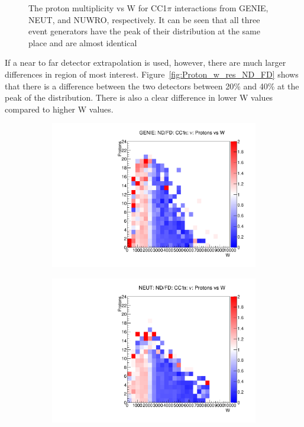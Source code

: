 \documentclass[12pt]{article}
\begin{document}
\begin{figure}
\begin{subfigure}[b]{0.32\textwidth}
\end{subfigure}
\caption{The proton multiplicity vs W for CC1$\pi$ interactions from GENIE, NEUT, and NUWRO, respectively.  It can be seen that all three event generators have the peak of their distribution at the same place and are almost identical}
\label{fig:Proton_w_res_ND}
\end{figure}

If a near to far detector extrapolation is used, however, there are much larger differences in region of most interest. 
Figure~\ref{fig:Proton_w_res_ND_FD} shows that there is a difference between the two detectors between 20\% and 40\% at the peak of the distribution.  
There is also a clear difference in lower W values compared to higher W values. 


\begin{figure}
\centering
\begin{subfigure}[b]{0.32\textwidth}
  \includegraphics[width=\textwidth]{nprotons_w/Nprotons_W_nuc_rest_res_GENIE_ND_FD_numu_norm.pdf}
\end{subfigure}
\begin{subfigure}[b]{0.32\textwidth}
  \includegraphics[width=\textwidth]{nprotons_w/Nprotons_W_nuc_rest_res_NEUT_ND_FD_numu_norm.pdf}

\end{subfigure}
\end{figure}
\end{document}
